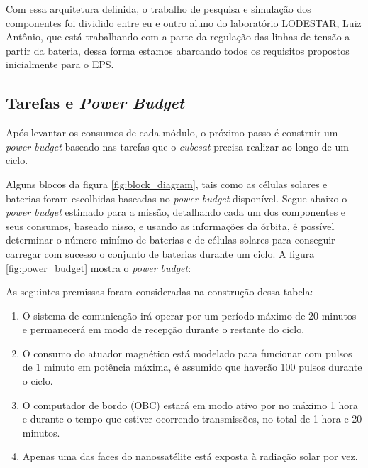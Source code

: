Com essa arquitetura definida, o trabalho de pesquisa e simulação dos componentes foi dividido entre eu e outro aluno do laboratório LODESTAR, Luiz Antônio, que está trabalhando com a parte da regulação das linhas de tensão a partir da bateria, dessa forma estamos abarcando todos os requisitos propostos inicialmente para o EPS.

\subsection*{Tarefas e \textit{Power Budget}}

Após levantar os consumos de cada módulo, o próximo passo é construir um \textit{power budget} baseado nas tarefas que o \textit{cubesat} precisa realizar ao longo de um ciclo.  

Alguns blocos da figura \ref{fig:block_diagram}, tais como as células solares e baterias foram escolhidas baseadas no \textit{power budget} disponível. Segue abaixo o \textit{power budget} estimado para a missão, detalhando cada um dos componentes e seus consumos, baseado nisso, e usando as informações da órbita, é possível determinar o número minímo de baterias e de células solares para conseguir carregar com sucesso o conjunto de baterias durante um ciclo. A figura \ref{fig:power_budget} mostra o \textit{power budget}:

\noindent
\begin{minipage}{\linewidth}
\label{fig:power_budget}
\end{minipage}

As seguintes premissas foram consideradas na construção dessa tabela:

\begin{enumerate}
    \item O sistema de comunicação irá operar por um período máximo de 20 minutos e permanecerá em modo de recepção durante o restante do ciclo.
    \item O consumo do atuador magnético está modelado para funcionar com pulsos de 1 minuto em potência máxima, é assumido que haverão 100 pulsos durante o ciclo.
    \item O computador de bordo (OBC) estará em modo ativo por no máximo 1 hora e durante o tempo que estiver ocorrendo transmissões, no total de 1 hora e 20 minutos.
    \item Apenas uma das faces do nanossatélite está exposta à radiação solar por vez.
\end{enumerate}


